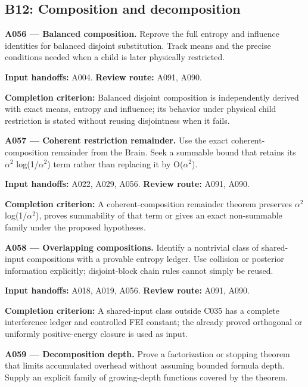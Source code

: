 \documentclass[11pt]{article}
\begin{document}
\subsection{B12: Composition and decomposition}

\textbf{A056 --- Balanced composition.} Reprove the full entropy and influence identities for balanced disjoint substitution. Track means and the precise conditions needed when a child is later physically restricted.

{\small\color{ink}\textbf{Input handoffs:} A004. \textbf{Review route:} A091, A090.\par
\textbf{Completion criterion:} Balanced disjoint composition is independently derived with exact means, entropy and influence; its behavior under physical child restriction is stated without reusing disjointness when it fails.\par}



\textbf{A057 --- Coherent restriction remainder.} Use the exact coherent-composition remainder from the Brain. Seek a summable bound that retains its $\alpha^2$ log(1/$\alpha^2$) term rather than replacing it by O($\alpha^2$).

{\small\color{ink}\textbf{Input handoffs:} A022, A029, A056. \textbf{Review route:} A091, A090.\par
\textbf{Completion criterion:} A coherent-composition remainder theorem preserves $\alpha^2$ log(1/$\alpha^2$), proves summability of that term or gives an exact non-summable family under the proposed hypotheses.\par}



\textbf{A058 --- Overlapping compositions.} Identify a nontrivial class of shared-input compositions with a provable entropy ledger. Use collision or posterior information explicitly; disjoint-block chain rules cannot simply be reused.

{\small\color{ink}\textbf{Input handoffs:} A018, A019, A056. \textbf{Review route:} A091, A090.\par
\textbf{Completion criterion:} A shared-input class outside C035 has a complete interference ledger and controlled FEI constant; the already proved orthogonal or uniformly positive-energy closure is used as input.\par}



\textbf{A059 --- Decomposition depth.} Prove a factorization or stopping theorem that limits accumulated overhead without assuming bounded formula depth. Supply an explicit family of growing-depth functions covered by the theorem.
\end{document}
